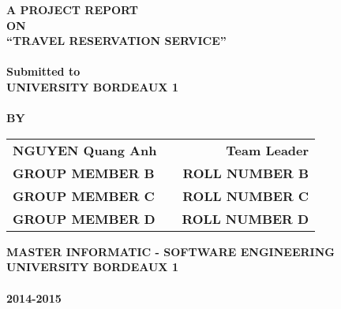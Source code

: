 \newpage
\begin{center}
\thispagestyle{empty}
\Large{\textbf{A PROJECT REPORT\\ \large{ON}}}\\[0.7cm]
\LARGE{\textsc {\textbf{``TRAVEL RESERVATION SERVICE''}}}\\[0.5cm]
\vspace{0.5cm}
\Large{\textbf{\\Submitted to}}
\LARGE{\textbf{\\UNIVERSITY BORDEAUX 1\\}}
\vspace{1cm}
\vspace{1cm}
\Large{\textbf{\\BY}}\\[0.5cm]
\begin{table}[h]
\centering
\Large{
\begin{tabular}{>{\bfseries}lc>{\bfseries}r}
NGUYEN Quang Anh & & Team Leader\\GROUP MEMBER B & & ROLL NUMBER B\\GROUP MEMBER C & & ROLL NUMBER C\\GROUP MEMBER D & & ROLL NUMBER D\\
\end{tabular}}
\end{table}
\vspace{1.5cm}
\large{\textbf{MASTER INFORMATIC - SOFTWARE ENGINEERING}}\\
\Large{\textbf{UNIVERSITY BORDEAUX 1}}\\
\large{\textbf{\\2014-2015}}\\
\vspace{1cm}
\newpage
\end{center}